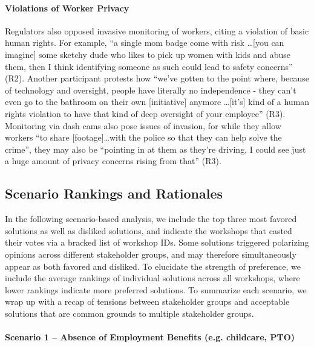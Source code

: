 \paragraph{Violations of Worker Privacy}
Regulators also opposed invasive monitoring of workers, citing a violation of basic human rights. 
For example, ``a single mom badge come with risk \dots [you can imagine] some sketchy dude who likes to pick up women with kids and abuse them, then I think identifying someone as such could lead to safety concerns'' (R2). 
Another participant protests how ``we've gotten to the point where, because of technology and oversight, people have literally no independence - they can't even go to the bathroom on their own [initiative] anymore \dots [it's] kind of a human rights violation to have that kind of deep oversight of your employee'' (R3).
Monitoring via dash cams also pose issues of invasion, for while they allow workers ``to share [footage]\dots with the police so that they can help solve the crime'', they may also be ``pointing in at them as they're driving, I could see just a huge amount of privacy concerns rising from that'' (R3). 


\subsection{Scenario Rankings and Rationales}
In the following scenario-based analysis, we include the top three most favored solutions as well as disliked solutions, and indicate the workshops that casted their votes via a bracked list of workshop IDs. Some solutions triggered polarizing opinions across different stakeholder groups, and may therefore simultaneously appear as both favored and disliked. To elucidate the strength of preference, we include the average rankings of individual solutions across all workshops, where lower rankings indicate more preferred solutions. To summarize each scenario, we wrap up with a recap of tensions between stakeholder groups and acceptable solutions that are common grounds to multiple stakeholder groups. 

\FloatBarrier

\FloatBarrier

\paragraph{Scenario 1 -- Absence of Employment Benefits (e.g. childcare, PTO)} \label{s1}


